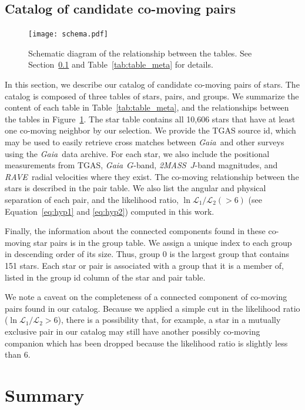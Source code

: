 \documentclass[manuscript, letterpaper]{aastex6}
\newcommand{\project}[1]{\textsl{#1}}
\newcommand{\acronym}[1]{{\small{#1}}}
\newcommand{\gaia}{\project{Gaia}}
\newcommand{\rave}{\project{\acronym{RAVE}}}
\newcommand{\tmass}{\project{\acronym{2MASS}}}
\newcommand{\sectionname}{Section}
\newcommand{\eqname}{Equation}
\newcommand{\tgas}{\acronym{TGAS}}
\begin{document}
\subsection{Catalog of candidate co-moving pairs}
\label{sub:catalog}


\begin{figure}[htbp]
  \centering
  \texttt{[image: schema.pdf]}
  \caption{Schematic diagram of the relationship between the tables.
    See \sectionname~\ref{sub:catalog} and Table~\ref{tab:table_meta} for details.
    \label{fig:schema}}
\end{figure}



In this section, we describe our catalog of candidate co-moving pairs of stars.
The catalog is composed of three tables of stars, pairs, and groups.
We summarize the content of each table in Table~\ref{tab:table_meta}, and
the relationships between the tables in Figure~\ref{fig:schema}.
The star table contains all 10,606 stars that have at least one co-moving neighbor
by our selection. We provide the TGAS source id, which may be used to easily
retrieve cross matches between \gaia\ and other surveys
using the \gaia\ data archive.
For each star, we also include the positional measurements from \tgas,
\gaia\ $G$-band, \tmass\ $J$-band magnitudes, and
\rave\ radial velocities where they exist.
The co-moving relationship between the stars is described in the pair table.
We also list the angular and physical separation of each pair, and the likelihood ratio,
$\ln \mathcal{L}_1 /\mathcal{L}_2(>6)$ (see \eqname~\ref{eq:hyp1} and \ref{eq:hyp2})
computed in this work.

Finally, the information about the connected components found in these co-moving
star pairs is in the group table. We assign a unique index to each group
in descending order of its size. Thus, group 0 is the largest group
that contains 151 stars.
Each star or pair is associated with a group that it is a member of, listed
in the group id column of the star and pair table.

We note a caveat on the completeness of a connected component of co-moving
pairs found in our catalog. Because we applied a simple cut in the likelihood
ratio ($\ln \mathcal{L}_1 /\mathcal{L}_2>6$), there is a possibility that, for
example, a star in a mutually exclusive pair in our catalog may still have
another possibly co-moving companion which has been dropped because the
likelihood ratio is slightly less than 6.

\section{Summary}\label{sec:summary}
\end{document}

